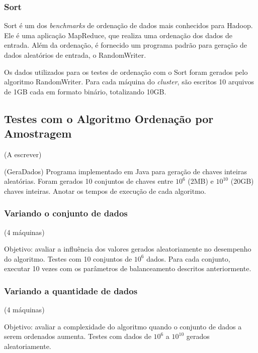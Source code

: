 % 
%
\subsubsection{Sort}

Sort é um dos \textit{benchmarks}  de ordenação de dados mais conhecidos para Hadoop. Ele é uma aplicação MapReduce, que realiza uma ordenação dos dados de entrada. Além da ordenação, é fornecido um programa padrão para geração de dados aleatórios de entrada, o RandomWriter. 

Os dados utilizados para os testes de ordenação com o Sort foram gerados pelo algoritmo RandomWriter. Para cada máquina do \textit{cluster}, são escritos 10 arquivos de 1GB cada em formato binário, totalizando 10GB.
% 




\subsection{Testes com o Algoritmo Ordenação por Amostragem}

(A escrever)

(GeraDados)
Programa implementado em Java para geração de chaves inteiras aleatórias.
Foram gerados 10 conjuntos de chaves entre $10^{6}$ (2MB) e  $10^{10}$ (20GB) chaves inteiras. 
Anotar os tempos de execução de cada algoritmo.

\subsubsection{Variando o conjunto de dados} 
 (4 máquinas)

Objetivo: avaliar a influência dos valores gerados aleatoriamente no desempenho do algoritmo. 
Testes com 10 conjuntos de $10^{6}$ dados. 
Para cada conjunto, executar 10 vezes com os parâmetros de balanceamento descritos anteriormente. 

\subsubsection{Variando a quantidade de dados} (4 máquinas)
 
Objetivo: avaliar a complexidade do algoritmo quando o conjunto de dados a serem ordenados aumenta.
Testes com dados de $10^{6}$ a $10^{10}$ gerados aleatoriamente.
 
